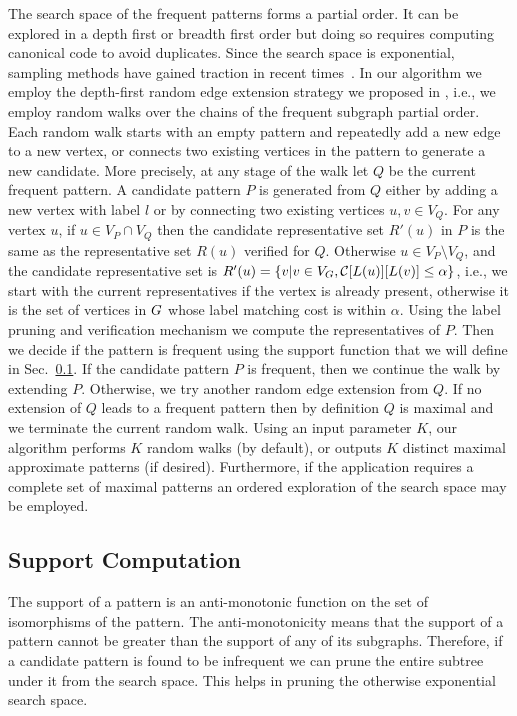 The search space of the frequent patterns forms a partial order.  It can
be explored in a depth first or breadth first order but doing so
requires computing canonical code to avoid duplicates. Since the search
space is exponential, sampling methods have gained traction in recent
times~\cite{2008-origami:sadm,2009-graphsampling}.  In our algorithm we
employ the depth-first random edge extension strategy we proposed in
\cite{2012-kais}, i.e., we employ random walks over the chains of the
frequent subgraph partial order.  Each random walk starts with an empty
pattern and repeatedly add a new edge to a new vertex, or connects two
existing vertices in the pattern to generate a new candidate. More
precisely, at any stage of the walk let $Q$ be the current frequent
pattern.  A candidate pattern $P$ is generated from $Q$ either by adding
a new vertex with label $l$ or by connecting two existing vertices $u, v
\in V_Q$.  For any vertex $u$, if $u \in V_P \cap V_Q$ then the
candidate representative set $R'(u)$ in $P$ is the same as the representative
set $R(u)$ verified for $Q$. Otherwise $u \in V_P \setminus V_Q$, and
the candidate representative set is $R'(u) = \{ v | v \in V_G,
{\mathcal{C}}[L(u)][L(v)] \leq \alpha \}$, i.e., we start with the
current representatives if the vertex is already present, otherwise it
is the set of vertices in $G$ whose label matching cost is within
$\alpha$. Using the label pruning and verification mechanism we compute
the representatives of $P$.  Then we decide if the pattern is frequent
using the support function that we will define in
Sec.~\ref{sec:support}. If the candidate pattern $P$ is frequent,
then we continue the walk by extending $P$. Otherwise, we try another
random edge extension from $Q$.  If no extension of $Q$ leads to a
frequent pattern then by definition $Q$ is maximal and we terminate the
current random walk.  Using an input parameter $K$, our algorithm
performs $K$ random walks (by default), or outputs $K$ distinct maximal
approximate patterns (if desired).  Furthermore, if the application
requires a complete set of maximal patterns an ordered exploration of
the search space may be employed.

\subsection{Support Computation} \label{sec:support} The support of a
pattern is an anti-monotonic function on the set of isomorphisms of the
pattern. The anti-monotonicity means that the support of a pattern
cannot be greater than the support of any of its subgraphs.
Therefore, if
a candidate pattern is found to be infrequent we can prune the entire
subtree under it from the search space.  This helps in pruning the
otherwise exponential search space. 

